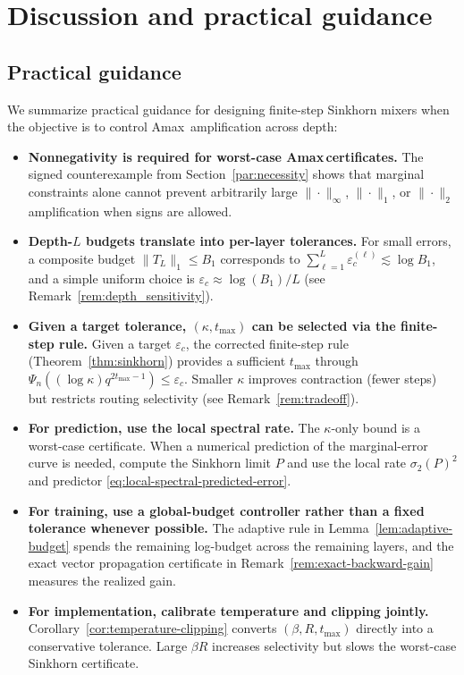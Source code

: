 \documentclass[11pt]{article}
\numberwithin{equation}{section}
\theoremstyle{plain}
\theoremstyle{definition}
\theoremstyle{remark}
\newcommand{\Amax}{\textsf{Amax}\,}
\begin{document}
\section{Discussion and practical guidance}\label{sec:discussion}
\subsection{Practical guidance}\label{subsec:guidance}
We summarize practical guidance for designing finite-step Sinkhorn mixers when the objective is to control \Amax
amplification across depth:
\begin{itemize}[leftmargin=*, itemsep=0.25em]
\item \textbf{Nonnegativity is required for worst-case \Amax certificates.}
The signed counterexample from Section~\ref{par:necessity} shows that marginal constraints alone cannot prevent arbitrarily large
$\|\cdot\|_\infty$, $\|\cdot\|_1$, or $\|\cdot\|_2$ amplification when signs are allowed.

\item \textbf{Depth-$L$ budgets translate into per-layer tolerances.}
For small errors, a composite budget $\|T_L\|_1\le B_1$ corresponds to
$\sum_{\ell=1}^L \varepsilon_c^{(\ell)}\lesssim \log B_1$, and a simple uniform choice is
$\varepsilon_c \approx \log(B_1)/L$ (see Remark~\ref{rem:depth_sensitivity}).

\item \textbf{Given a target tolerance, $(\kappa,t_{\max})$ can be selected via the finite-step rule.}
Given a target $\varepsilon_c$, the corrected finite-step rule (Theorem~\ref{thm:sinkhorn}) provides a sufficient $t_{\max}$ through
$\Psi_n\!\left((\log\kappa)q^{2t_{\max}-1}\right)\le\varepsilon_c$. Smaller $\kappa$ improves contraction (fewer steps) but restricts routing selectivity (see Remark~\ref{rem:tradeoff}).

\item \textbf{For prediction, use the local spectral rate.}
The $\kappa$-only bound is a worst-case certificate. When a numerical prediction of the marginal-error curve is needed, compute the Sinkhorn limit $P$ and use the local rate $\sigma_2(P)^2$ and predictor \eqref{eq:local-spectral-predicted-error}.

\item \textbf{For training, use a global-budget controller rather than a fixed tolerance whenever possible.}
The adaptive rule in Lemma~\ref{lem:adaptive-budget} spends the remaining log-budget across the remaining layers, and the exact vector propagation certificate in Remark~\ref{rem:exact-backward-gain} measures the realized gain.

\item \textbf{For implementation, calibrate temperature and clipping jointly.}
Corollary~\ref{cor:temperature-clipping} converts $(\beta,R,t_{\max})$ directly into a conservative tolerance. Large $\beta R$ increases selectivity but slows the worst-case Sinkhorn certificate.
\end{itemize}
\end{document}
